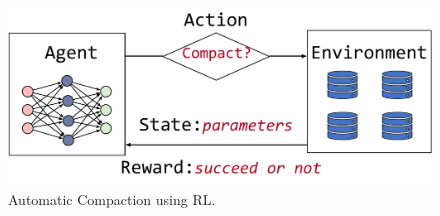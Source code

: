 


\begin{figure}[htbp]
	\includegraphics[scale=0.38]{figures/rl}
	\centering
	\vspace{-1em}
	\caption{Automatic Compaction using RL.}
	\label{fig:rl}
	\vspace{-1em}
\end{figure}







